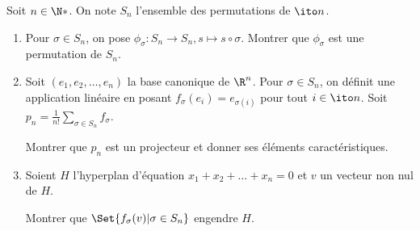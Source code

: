 \begin{enonce}
\begin{exercise}[ID={RMS126 E756},subtitle={Centrale PSI 2015},tags={}, difficulty={0}]
Soit $n\in\N*$.
On note $S_n$ l'ensemble des permutations de $\ito n$.
\begin{enumerate}
  \item Pour $\sigma\in S_n$, on pose $\phi_\sigma:S_n\to S_n, s\mapsto s\circ \sigma$.
    Montrer que $\phi_\sigma$ est une permutation de $S_n$.

  \item Soit $(e_1,e_2,\dots,e_n)$ la base canonique de $\R^n$.
    Pour $\sigma\in S_n$, on définit une application linéaire en posant $f_\sigma(e_i) = e_{\sigma(i)}$ pour tout $i\in\ito n$.
    Soit $p_n=\frac{1}{n!}\sum_{\sigma\in S_n} f_\sigma$.

    Montrer que $p_n$ est un projecteur et donner ses éléments caractéristiques.

  \item Soient $H$ l'hyperplan d'équation $x_1+x_2+\dots+x_n=0$ et $v$ un vecteur non nul de $H$.

    Montrer que $\Set{f_\sigma(v) | \sigma\in S_n}$ engendre $H$.
\end{enumerate}
\end{exercise}
\begin{solution}
\end{solution}
\end{enonce}
